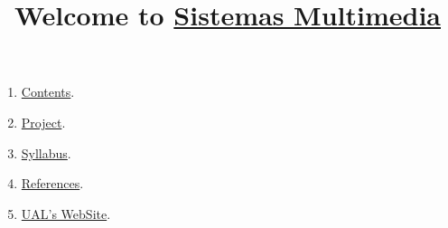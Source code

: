 
%
\title{Welcome to \href{https://www.ual.es/estudios/masteres/presentacion/plandeestudios/asignatura/7114/71142105}{Sistemas Multimedia}}

\maketitle

\begin{enumerate}
\item \href{https://sistemas-multimedia.github.io/contents}{Contents}.
\item \href{https://github.com/Sistemas-Multimedia/VCF}{Project}.
\item \href{https://sistemas-multimedia.github.io/syllabus}{Syllabus}.
\item \href{https://sistemas-multimedia.github.io/references}{References}.
\item \href{https://www.ual.es/estudios/masteres/presentacion/plandeestudios/asignatura/7114/71142105}{UAL's WebSite}.
\end{enumerate}
